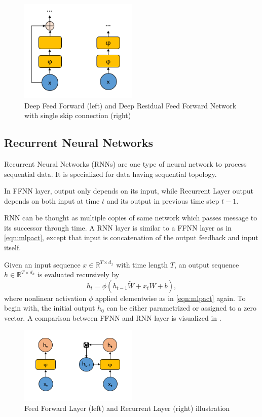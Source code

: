 \begin{figure}
	\centering
	\includegraphics[width=0.5\textwidth]{figures/ml_theory/rffnn_vs_ffnn.png}
	\caption{Deep Feed Forward (left) and Deep Residual Feed Forward Network with single skip connection (right)}
	\label{fig:rffnn_ffnn}
\end{figure}

\subsection{Recurrent Neural Networks}

Recurrent Neural Networks (RNNs) \cite{rumelhart_learning_1986} are one type of neural network to process sequential data. 
It is specialized for data having sequential topology. 

In FFNN layer, output only depends on its input, while Recurrent Layer output depends on both input at time $t$ and its output in previous time step $t-1$. 

RNN can be thought as multiple copies of same network which passes message to its successor through time. 
A RNN layer is similar to a FFNN layer as in \eqref{eqn:mlpact}, 
except that input is concatenation of the output feedback and input itself.

Given an input sequence $x \in \mathbb{R}^{T \times d_x}$ with time length $T$, an output sequence $h \in \mathbb{R}^{T \times d_h}$ is evaluated recursively by 
\begin{equation}
\label{eqn:rnnact}
h_t = \phi(h_{t-1} \tilde{W} + x_t W + b),
\end{equation}
where nonlinear activation $\phi$ applied elementwise as in \eqref{eqn:mlpact} again. 
To begin with, the initial output $h_0$ can be either parametrized or assigned to a zero vector. A comparison between FFNN and RNN layer is visualized in .

\begin{figure}
	\centering
	\includegraphics[width=0.5\textwidth]{figures/ml_theory/ffnn_vs_rnn.png}
	\caption{Feed Forward Layer (left) and Recurrent Layer (right) illustration~\cite{olah_understanding_2015}}
	\label{fig:rnn_vs_ffnn}
\end{figure}

